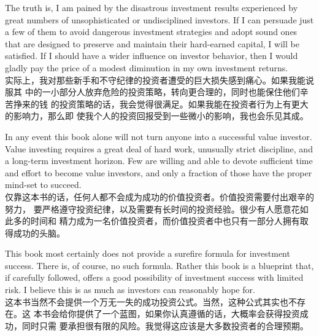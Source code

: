 \begin{verseparallel}
  {
    The truth is, I am pained by the disastrous investment results experienced by
    great numbers of unsophisticated or undisciplined investors. If I can persuade
    just a few of them to avoid dangerous investment strategies and adopt sound ones
    that are designed to preserve and maintain their hard-earned capital, I will be
    satisfied. If I should have a wider influence on investor behavior, then I would
    gladly pay the price of a modest diminution in my own investment returns. \\
  }
  {
    实际上，我对那些新手和不守纪律的投资者遭受的巨大损失感到痛心。如果我能说服其
    中的一小部分人放弃危险的投资策略，转向更合理的，同时也能保住他们辛苦挣来的钱
    的投资策略的话，我会觉得很满足。如果我能在投资者行为上有更大的影响力，那么即
    使我个人的投资回报受到一些微小的影响，我也会乐见其成。
  }
\end{verseparallel}

\begin{verseparallel}
  {
    In any event this book alone will not turn anyone into a successful value
    investor. Value investing requires a great deal of hard work, unusually
    strict discipline, and a long-term investment horizon. Few are willing and
    able to devote sufficient time and effort to become value investors, and
    only a fraction of those have the proper mind-set to succeed. \\
  }
  {
    仅靠这本书的话，任何人都不会成为成功的价值投资者。价值投资需要付出艰辛的努力，
    要严格遵守投资纪律，以及需要有长时间的投资经验。很少有人愿意花如此多的时间和
    精力成为一名价值投资者，而价值投资者中也只有一部分人拥有取得成功的头脑。
  }
\end{verseparallel}

\begin{verseparallel}
  {
    This book most certainly does not provide a surefire formula for investment
    success. There is, of course, no such formula. Rather this book is a
    blueprint that, if carefully followed, offers a good possibility of
    investment success with limited risk. I believe this is as much as investors
    can reasonably hope for. \\
  }
  {
    这本书当然不会提供一个万无一失的成功投资公式。当然，这种公式其实也不存在。这
    本书会给你提供了一个蓝图，如果你认真遵循的话，大概率会获得投资成功，同时只需
    要承担很有限的风险。我觉得这应该是大多数投资者的合理预期。
  }
\end{verseparallel}

